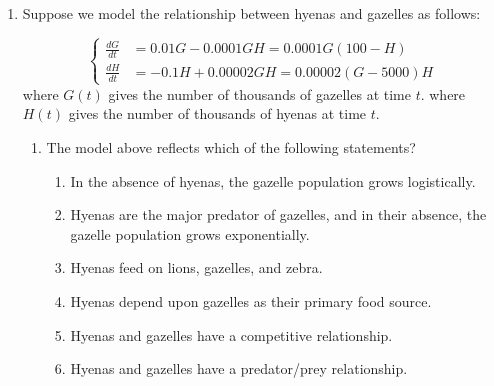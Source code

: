 \documentclass[main]{subfiles}
\begin{document}
\begin{enumerate}

\item 


Suppose we model the relationship between hyenas and gazelles as follows:


\[ \left\{
\begin{aligned}
\frac{dG}{dt} & = 0.01G - 0.0001 GH = 0.0001G(100- H) \\ 
\frac{dH}{dt} & = -0.1 H + 0.00002 GH = 0.00002(G-5000) H
\end{aligned}
\right.\]
where $G(t)$ gives the number of thousands of gazelles at time $t$. 
where $H(t)$ gives the number of thousands of hyenas at time $t$.
\begin{enumerate}
\item
  \begin{problem}[1in]

    The model above reflects which of the following statements?

  \begin{enumerate}
    \item In the absence of hyenas, the gazelle population grows logistically.
    \item Hyenas are the major predator of gazelles, and in their absence, the gazelle population grows exponentially. 
    \item Hyenas feed on lions, gazelles, and zebra.
    \item Hyenas depend upon gazelles as their primary food source.
    \item Hyenas and gazelles have a competitive relationship.
    \item Hyenas and gazelles have a predator/prey relationship. 
  \end{enumerate}
  \end{problem}


\end{enumerate}
\end{enumerate}
\end{document}
